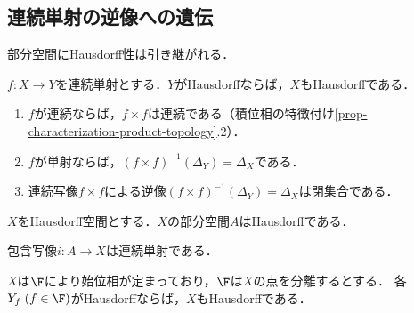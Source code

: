 \documentclass[uplatex,dvipdfmx]{jsreport}
\begin{document}
\subsection{連続単射の逆像への遺伝}

\begin{tcolorbox}[colframe=ForestGreen, colback=ForestGreen!10!white,breakable,colbacktitle=ForestGreen!40!white,coltitle=black,fonttitle=\bfseries\sffamily,
title=]
    部分空間にHausdorff性は引き継がれる．
\end{tcolorbox}

\begin{proposition}\label{prop-Hausdorff性は連続単射によって足に感染る}
    $f:X\to Y$を連続単射とする．$Y$がHausdorffならば，$X$もHausdorffである．
\end{proposition}
\begin{Proof}\mbox{}
    \begin{enumerate}
        \item $f$が連続ならば，$f\times f$は連続である（積位相の特徴付け\ref{prop-characterization-product-topology}.2）．
        \item $f$が単射ならば，$(f\times f)^{-1}(\Delta_Y)=\Delta_X$である．
        \item 連続写像$f\times f$による逆像$(f\times f)^{-1}(\Delta_Y)=\Delta_X$は閉集合である．
    \end{enumerate}
\end{Proof}

\begin{corollary}\label{cor-subspace-of-Hausdorff-is-Hausdorff}
    $X$をHausdorff空間とする．$X$の部分空間$A$はHausdorffである．
\end{corollary}
\begin{Proof}
    包含写像$i:A\to X$は連続単射である．
\end{Proof}

\begin{proposition}
    $X$は$\F$により始位相が定まっており，$\F$は$X$の点を分離するとする．
    各$Y_f\;(f\in\F)$がHausdorffならば，$X$もHausdorffである．
\end{proposition}
\end{document}
